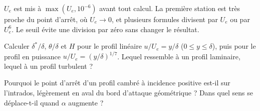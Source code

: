 \begin{piege}
$U_e$ est mis à $\max(U_e,10^{-6})$ avant tout calcul. La première station est très proche du point d'arrêt, où $U_e\to0$, et plusieurs formules divisent par $U_e$ ou par $U_e^6$. Le seuil évite une division par zéro sans changer le résultat.
\end{piege}

\exercices
\begin{exercice}
Calculer $\delta^*/\delta$, $\theta/\delta$ et $H$ pour le profil linéaire $u/U_e=y/\delta$ ($0\le y\le\delta$), puis pour le profil en puissance $u/U_e=(y/\delta)^{1/7}$. Lequel ressemble à un profil laminaire, lequel à un profil turbulent ?
\end{exercice}
\begin{exercice}
Pourquoi le point d'arrêt d'un profil cambré à incidence positive est-il sur l'intrados, légèrement en aval du bord d'attaque géométrique ? Dans quel sens se déplace-t-il quand $\alpha$ augmente ?
\end{exercice}
